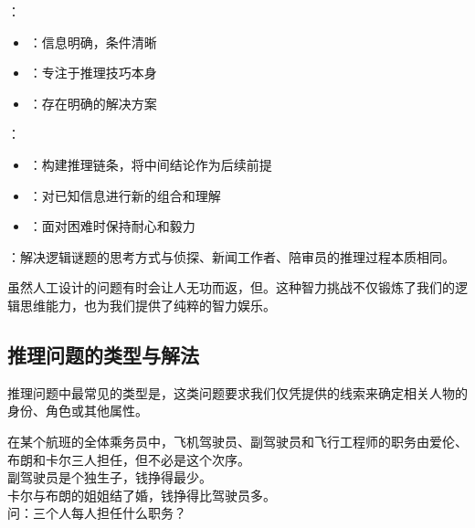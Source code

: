 \begin{theorembox}[title=人工设计问题与现实问题的对比]
：
\begin{itemize}
  \item {}：信息明确，条件清晰
  \item {}：专注于推理技巧本身
  \item {}：存在明确的解决方案
\end{itemize}

：
\begin{itemize}
  \item {}：构建推理链条，将中间结论作为后续前提
  \item {}：对已知信息进行新的组合和理解
  \item {}：面对困难时保持耐心和毅力
\end{itemize}

：解决逻辑谜题的思考方式与侦探、新闻工作者、陪审员的推理过程本质相同。
\end{theorembox}

虽然人工设计的问题有时会让人无功而返，但。这种智力挑战不仅锻炼了我们的逻辑思维能力，也为我们提供了纯粹的智力娱乐。


\subsection{推理问题的类型与解法}

推理问题中最常见的类型是，这类问题要求我们仅凭提供的线索来确定相关人物的身份、角色或其他属性。

\begin{examplebox}[title=航班乘务员职务分配问题]
\begin{displayquote}
在某个航班的全体乘务员中，飞机驾驶员、副驾驶员和飞行工程师的职务由爱伦、布朗和卡尔三人担任，但不必是这个次序。\\
副驾驶员是个独生子，钱挣得最少。\\
卡尔与布朗的姐姐结了婚，钱挣得比驾驶员多。\\
问：三个人每人担任什么职务？
\end{displayquote}
\end{examplebox}

